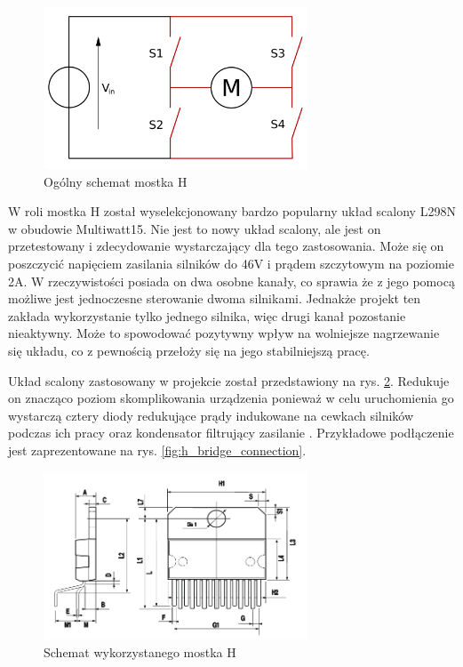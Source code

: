             \begin{figure}[ht]
                \centering
                \includegraphics[width=0.7\textwidth]{img/h_bridge_schametic.png}
                \caption{Ogólny schemat mostka H \cite{h_bridge_conn_fig}}
                \label{fig:h_bridge_schematic}
            \end{figure}
            
            W roli mostka H został wyselekcjonowany bardzo popularny układ scalony L298N w obudowie Multiwatt15. Nie jest to nowy układ scalony, ale jest on przetestowany i zdecydowanie wystarczający dla tego zastosowania. Może się on poszczycić napięciem zasilania silników do 46V i prądem szczytowym na poziomie 2A. W rzeczywistości posiada on dwa osobne kanały, co sprawia że z jego pomocą możliwe jest jednoczesne sterowanie dwoma silnikami. Jednakże projekt ten zakłada wykorzystanie tylko jednego silnika, więc drugi kanał pozostanie nieaktywny. Może to spowodować pozytywny wpływ na wolniejsze nagrzewanie się układu, co z pewnością przełoży się na jego stabilniejszą pracę. 
            
            Układ scalony zastosowany w projekcie został przedstawiony na rys. \ref{fig:h_bridge}. Redukuje on znacząco poziom skomplikowania urządzenia ponieważ w celu uruchomienia go wystarczą cztery diody redukujące prądy indukowane na cewkach silników podczas ich pracy oraz kondensator filtrujący zasilanie \cite{mostek}. Przykładowe podłączenie jest zaprezentowane na rys. \ref{fig:h_bridge_connection}.
            
            \begin{figure}[ht]
                \centering
                \includegraphics[width=0.7\textwidth]{img/h_bridge.png}
                \caption{Schemat wykorzystanego mostka H \cite{h_bridge_fig}}
                \label{fig:h_bridge}
            \end{figure}
            
